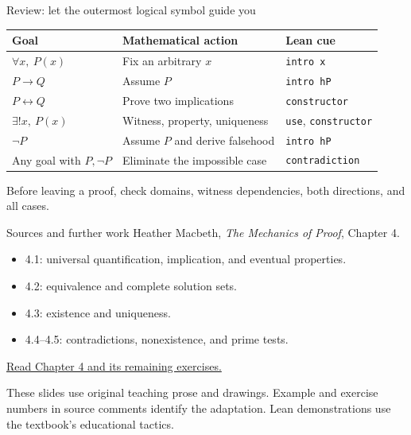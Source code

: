 \begin{frame}{Review: let the outermost logical symbol guide you}
\begin{center}
\begin{tabular}{lll}
\toprule
Goal & Mathematical action & Lean cue\\\midrule
$\forall x,\ P(x)$ & Fix an arbitrary $x$ & \texttt{intro x}\\
$P\to Q$ & Assume $P$ & \texttt{intro hP}\\
$P\leftrightarrow Q$ & Prove two implications & \texttt{constructor}\\
$\exists!x,\ P(x)$ & Witness, property, uniqueness & \texttt{use}, \texttt{constructor}\\
$\neg P$ & Assume $P$ and derive falsehood & \texttt{intro hP}\\
Any goal with $P,\neg P$ & Eliminate the impossible case & \texttt{contradiction}\\\bottomrule
\end{tabular}
\end{center}
Before leaving a proof, check domains, witness dependencies, both directions, and all cases.
\end{frame}

\begin{frame}{Sources and further work}
Heather Macbeth, \emph{The Mechanics of Proof}, Chapter 4.
\begin{itemize}
\item 4.1: universal quantification, implication, and eventual properties.
\item 4.2: equivalence and complete solution sets.
\item 4.3: existence and uniqueness.
\item 4.4--4.5: contradictions, nonexistence, and prime tests.
\end{itemize}
\medskip
\href{https://hrmacbeth.github.io/math2001/04_Proofs_with_Structure_II.html}{Read Chapter 4 and its remaining exercises.}
\medskip

These slides use original teaching prose and drawings. Example and exercise numbers in source comments identify the adaptation. Lean demonstrations use the textbook's educational tactics.
\end{frame}


